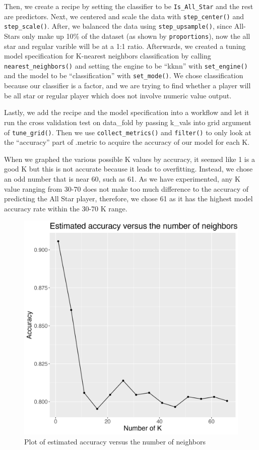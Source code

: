 \documentclass[
]{article}
\begin{document}
Then, we create a recipe by setting the classifier to be \texttt{Is\_All\_Star} and the rest are predictors. Next, we centered and scale the data with \texttt{step\_center()} and \texttt{step\_scale()}. After, we balanced the data using \texttt{step\_upsample()}, since All-Stars only make up 10\% of the dataset (as shown by \texttt{proportions}), now the all star and regular varible will be at a 1:1 ratio. Afterwards, we created a tuning model specification for K-nearest neighbors classification by calling \texttt{nearest\_neighbors()} and setting the engine to be ``kknn'' with \texttt{set\_engine()} and the model to be ``classification'' with \texttt{set\_mode()}. We chose classification because our classifier is a factor, and we are trying to find whether a player will be all star or regular player which does not involve numeric value output.

Lastly, we add the recipe and the model specification into a workflow and let it run the cross validation test on data\_fold by passing k\_vals into grid argument of \texttt{tune\_grid()}. Then we use \texttt{collect\_metrics()} and \texttt{filter()} to only look at the ``accuracy'' part of .metric to acquire the accuracy of our model for each K.

When we graphed the various possible K values by accuracy, it seemed like 1 is a good K but this is not accurate because it leads to overfitting. Instead, we chose an odd number that is near 60, such as 61. As we have experimented, any K value ranging from 30-70 does not make too much difference to the accuracy of predicting the All Star player, therefore, we chose 61 as it has the highest model accuracy rate within the 30-70 K range.

\begin{figure}
\includegraphics[width=0.8\linewidth]{results/accuracy_vs_k} \caption{Plot of estimated accuracy versus the number of neighbors}\label{fig:fig1}
\end{figure}
\end{document}
